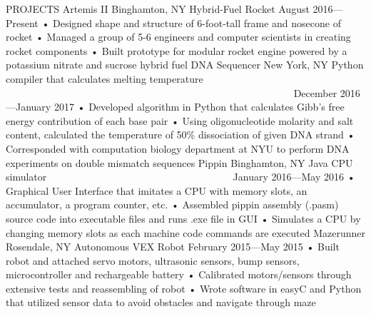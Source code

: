 \documentclass{article}
\begin{document}
PROJECTS
Artemis II											            Binghamton, NY
Hybrid-Fuel Rocket								                                      August 2016—Present
•	Designed shape and structure of 6-foot-tall frame and nosecone of rocket
•	Managed a group of 5-6 engineers and computer scientists in creating rocket components
•	Built prototype for modular rocket engine powered by a potassium nitrate and sucrose hybrid fuel
DNA Sequencer							                                                                      New York, NY
Python compiler that calculates melting temperature		                                                                    December 2016—January 2017
•	Developed algorithm in Python that calculates Gibb’s free energy contribution of each base pair
•	Using oligonucleotide molarity and salt content, calculated the temperature of 50\% dissociation of given DNA strand
•	Corresponded with computation biology department at NYU to perform DNA experiments on double mismatch sequences
Pippin										                                       Binghamton, NY
Java CPU simulator					                                           	      	                January 2016—May 2016
•	Graphical User Interface that imitates a CPU with memory slots, an accumulator, a program counter, etc.
•	Assembled pippin assembly (.pasm) source code into executable files and runs .exe file in GUI
•	Simulates a CPU by changing memory slots as each machine code commands are executed
Mazerunner									                      	                Rosendale, NY
Autonomous VEX Robot         								               February 2015—May 2015
•	Built robot and attached servo motors, ultrasonic sensors, bump sensors, microcontroller and rechargeable battery
•	Calibrated motors/sensors through extensive tests and reassembling of robot
•	Wrote software in easyC and Python that utilized sensor data to avoid obstacles and navigate through maze
\end{document}
